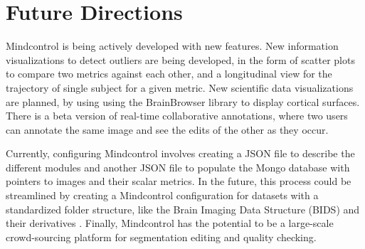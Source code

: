\section{Future Directions}

Mindcontrol is being actively developed with new features. New information visualizations to detect outliers are being developed, in the form of scatter plots to compare two metrics against each other, and a longitudinal view for the trajectory of single subject for a given metric. New scientific data visualizations are planned, by using using the BrainBrowser library \cite{Sherif_2015} to display cortical surfaces. There is a beta version of real-time collaborative annotations, where two users can annotate the same image and see the edits of the other as they occur. 

Currently, configuring Mindcontrol involves creating a JSON file to describe the different modules and another JSON file to populate the Mongo database with pointers to images and their scalar metrics. In the future, this process could be streamlined by creating a Mindcontrol configuration for datasets with a standardized folder structure, like the Brain Imaging Data Structure (BIDS) \cite{Gorgolewski_2016} and their derivatives \cite{gorgolewski2016bids}. Finally, Mindcontrol has the potential to be a large-scale crowd-sourcing platform for segmentation editing and quality checking.